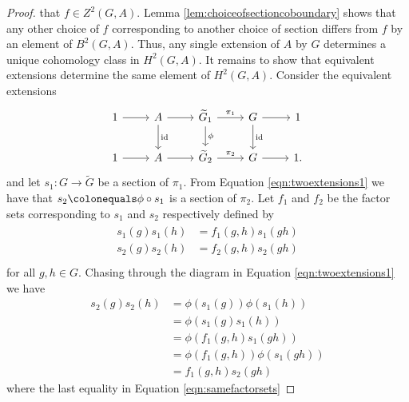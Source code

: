 \documentclass{dcthesis}
\newcommand{\wt}[1]{\widetilde{#1}}
\DeclareMathOperator{\id}{id}
\numberwithin{equation}{section}
\theoremstyle{definition}
\theoremstyle{remark}
\begin{document}
{{\begin{proof}
      that $f\in Z^2(G,A)$.
      Lemma \ref{lem:choiceofsectioncoboundary}
      shows that any other choice of $f$
      corresponding to another choice of section
      differs from $f$ by an element of
      $B^2(G,A)$.
      Thus,
      any single extension of $A$ by $G$
      determines a unique cohomology class
      in $H^2(G,A)$.
      It remains to show that equivalent extensions
      determine the same element of $H^2(G,A)$.
      Consider the
      equivalent extensions
      \begin{equation}
        \label{eqn:twoextensions1}
        \begin{tikzcd}
          1\arrow{r}&A\arrow{d}{\id}\arrow{r}{}&\wt{G}_1\arrow{r}{\pi_1}\arrow{d}{\phi}&G\arrow{d}{\id}\arrow{r}{}&1\\
          1\arrow{r}&A\arrow{r}{}&\wt{G}_2\arrow{r}{\pi_2}&G\arrow{r}{}&1.
        \end{tikzcd}
      \end{equation}
      and let
      $s_1\colon G\to\wt{G}$
      be a section of $\pi_1$.
      From Equation \ref{eqn:twoextensions1} we have that
      $s_2\colonequals \phi\circ s_1$ is a
      section of $\pi_2$.
      Let $f_1$ and $f_2$ be the factor sets
      corresponding to $s_1$
      and $s_2$ respectively
      defined by
      \begin{align}
        \label{eqn:twofactorsets}
        \begin{split}
          s_1(g)s_1(h) &= f_1(g,h)s_1(gh)\\
          s_2(g)s_2(h) &= f_2(g,h)s_2(gh)\\
        \end{split}
      \end{align}
      for all $g,h\in G$.
      Chasing through the diagram in
      Equation \ref{eqn:twoextensions1}
      we have
      \begin{equation}
        \label{eqn:samefactorsets}
        \begin{split}
          s_2(g)s_2(h)
          &=\phi(s_1(g))\phi(s_1(h))\\
          &=\phi(s_1(g)s_1(h))\\
          &=\phi(f_1(g,h)s_1(gh))\\
          &=\phi(f_1(g,h))\phi(s_1(gh))\\
          &=f_1(g,h)s_2(gh)
        \end{split}
      \end{equation}
      where the last equality in
      Equation \ref{eqn:samefactorsets}

\end{proof}}}
\end{document}
